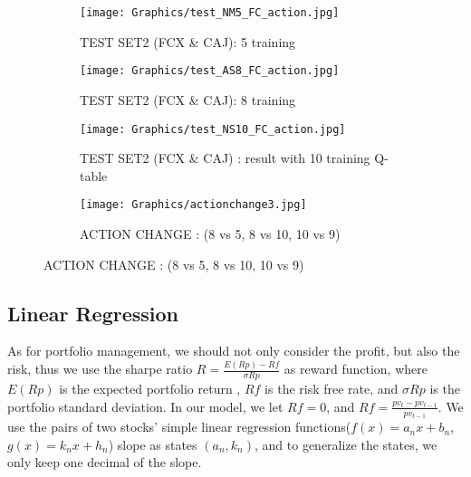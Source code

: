 \newpage

\begin{figure}[H]
\begin{subfigure}{.5\textwidth}%
\centering
\texttt{[image: Graphics/test\_NM5\_FC\_action.jpg]} \caption{TEST SET2 (FCX \& CAJ): 5 training} 
\end{subfigure}%
\vspace{0.1cm}
\begin{subfigure}{.5\textwidth}%
\centering
\texttt{[image: Graphics/test\_AS8\_FC\_action.jpg]} \caption{TEST SET2 (FCX \& CAJ): 8 training}
\end{subfigure}%
\begin{figure}[H]
\begin{center}
\texttt{[image: Graphics/test\_NS10\_FC\_action.jpg]} \caption{TEST SET2 (FCX \& CAJ) : result with 10 training Q-table}
\end{center}
\end{figure}
\begin{figure}[H]
\begin{center}
\texttt{[image: Graphics/actionchange3.jpg]} \caption{ACTION CHANGE : (8 vs 5, 8 vs 10, 10 vs 9)}
\end{center}
\end{figure}
\end{figure}

\subsection{Linear Regression}
As for portfolio management, we should not only consider the  profit, but also the risk, thus we use the sharpe ratio $R=\frac{E(Rp)-Rf}{\sigma Rp}$ as reward function, where $E(Rp)$ is the expected portfolio return , $Rf$ is the risk free rate, and $\sigma Rp$ is the portfolio standard deviation. In our model, we let $Rf=0$, and $Rf=\frac{pv_t-pv_{t-1}}{pv_{t-1}}$. We use the pairs of two stocks’ simple linear regression functions($f(x)=a_nx+b_n$, $g(x)=k_nx+h_n$) slope as states $(a_n,k_n)$, and to generalize the states, we only keep one decimal of the slope.

\vspace{0.5cm}

